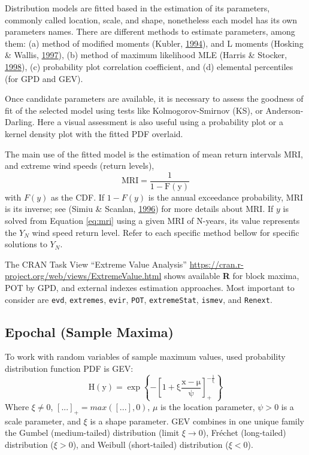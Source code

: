 \documentclass[12pt,twoside]{reedthesis}
\begin{document}
Distribution models are fitted based in the estimation of its parameters, commonly called location, scale, and shape, nonetheless each model has its own parameters names. There are different methods to estimate parameters, among them: (a) method of modified moments (Kubler, \protect\hyperlink{ref-Kubler1994}{1994}), and L moments (Hosking \& Wallis, \protect\hyperlink{ref-Hosking1997}{1997}), (b) method of maximum likelihood MLE (Harris \& Stocker, \protect\hyperlink{ref-Harris1994}{1998}), (c) probability plot correlation coefficient, and (d) elemental percentiles (for GPD and GEV).

Once candidate parameters are available, it is necessary to assess the goodness of fit of the selected model using tests like Kolmogorov-Smirnov (KS), or Anderson-Darling. Here a visual assessment is also useful using a probability plot or a kernel density plot with the fitted PDF overlaid.

The main use of the fitted model is the estimation of mean return intervals MRI, and extreme wind speeds (return levels),
\begin{equation}
\mathrm{
        MRI=\frac{1}{1-F(y)}
       }
  \label{eq:mri}
\end{equation}
with \(F(y)\) as the CDF. If \(1-F(y)\) is the annual exceedance probability, MRI is its inverse; see (Simiu \& Scanlan, \protect\hyperlink{ref-Simiu1996}{1996}) for more details about MRI. If \(y\) is solved from Equation \eqref{eq:mri} using a given MRI of N-years, its value represents the \(Y_N\) wind speed return level. Refer to each specific method bellow for specific solutions to \(Y_N\).

The CRAN Task View ``Extreme Value Analysis'' \url{https://cran.r-project.org/web/views/ExtremeValue.html} shows available \textbf{R} for block maxima, POT by GPD, and external indexes estimation approaches. Most important to consider are \texttt{evd}, \texttt{extremes}, \texttt{evir}, \texttt{POT}, \texttt{extremeStat}, \texttt{ismev}, and \texttt{Renext}.

\hypertarget{epochal-sample-maxima}{%
\subsection{Epochal (Sample Maxima)}\label{epochal-sample-maxima}}

To work with random variables of sample maximum values, used probability distribution function PDF is GEV:
\begin{equation}
\mathrm{
        H(y) = \exp\left\{-\left[1+\xi\frac{x-\mu}{\psi}\right]_+^{-\frac{1}{\xi}}\right\}
       }
  \label{eq:epochalpdf}
\end{equation}
Where \(\xi\neq0\), \([...]_+ = max([...],0)\), \(\mu\) is the location parameter, \(\psi > 0\) is a scale parameter, and \(\xi\) is a shape parameter. GEV combines in one unique family the Gumbel (medium-tailed) distribution (limit \(\xi\rightarrow0\)), Fréchet (long-tailed) distribution (\(\xi>0\)), and Weibull (short-tailed) distribution (\(\xi<0\)).
\end{document}
